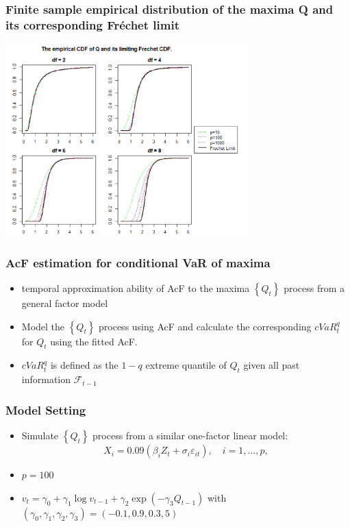 \documentclass{beamer}
\newcommand{\set}[1]{\left\{#1\right\}}
\begin{document}
\begin{frame}
    \frametitle{Finite sample empirical distribution of the maxima Q and its corresponding Fr\'echet limit}
    \begin{center}
        \includegraphics[width=0.7\textwidth]{fig2.png} 
    \end{center}
\end{frame}


\begin{frame}
    \frametitle{AcF estimation for conditional VaR of maxima}
\begin{itemize}
    \item temporal approximation ability of AcF to the maxima $\set{Q_t}$ process from a general factor model
    \bigskip
    \item Model the $\set{Q_t}$ process using AcF and calculate the corresponding $cVaR_t^q$ for $Q_t$ using the fitted AcF.
    \bigskip
    \item $cVaR_t^q$ is defined as the $1-q$ extreme quantile of $Q_t$ given all past information $\mathcal{F}_{t-1}$
\end{itemize}
\end{frame}


\begin{frame}
    \frametitle{Model Setting}
    \begin{itemize}
        \item Simulate $\set{Q_t}$ process from a similar one-factor linear model:
        $$
        X_i=0.09(\beta_iZ_t+\sigma_i\varepsilon_{it}),\quad i=1,\dots,p,
        $$
       
        \item $p=100$
        \bigskip
        \item $v_t=\gamma_0+\gamma_1\log v_{t-1}+\gamma_2\exp(-\gamma_3 Q_{t-1})$ with $(\gamma_0,\gamma_1,\gamma_2,\gamma_3)=(-0.1,0.9,0.3,5)$
        \bigskip
    \end{itemize}
    

\end{frame}
\end{document}
